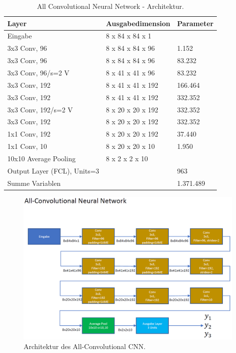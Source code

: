 \begin{table}[ht]
\centering
\caption{All Convolutional Neural Network - Architektur.}
\begin{tabular}{@{}lll@{}}
\hline
Layer & Ausgabedimension & Parameter\\
\hline
Eingabe & 8 x 84 x 84 x 1 & \\
3x3 Conv, 96 & 8 x 84 x 84 x 96 & 1.152\\
3x3 Conv, 96 & 8 x 84 x 84 x 96 & 83.232\\ 
3x3 Conv, 96/s=2 V & 8 x 41 x 41 x 96 & 83.232\\ 
3x3 Conv, 192 & 8 x 41 x 41 x 192 & 166.464\\
3x3 Conv, 192 & 8 x 41 x 41 x 192 & 332.352\\
3x3 Conv, 192/s=2 V & 8 x 20 x 20 x 192 & 332.352\\
3x3 Conv, 192 & 8 x 20 x 20 x 192 & 332.352\\
1x1 Conv, 192 & 8 x 20 x 20 x 192 & 37.440\\
1x1 Conv, 10 & 8 x 20 x 20 x 10 & 1.950\\
10x10 Average Pooling & 8 x 2 x 2 x 10 & \\
Output Layer (FCL), Units=3 & & 963\\
\hline
Summe Variablen & & 1.371.489\\
\hline
\end{tabular}
\label{tb:arch_allcnn}
\end{table}
\newpage
\begin{figure}[H]
\thispagestyle{empty}
\centering
\includegraphics[angle=90, scale=0.5]{pictures/inception/AllConvCNN}
\caption{Architektur des All-Convolutional CNN.}
\label{fig:arch_allcnn}
\end{figure}

